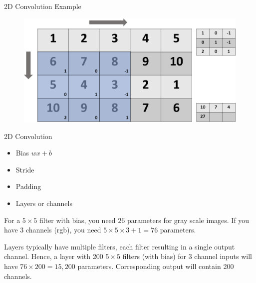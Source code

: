\begin{frame}{2D Convolution Example}
	\begin{figure}
		\includegraphics[width=.7\textwidth, center]{figures/conv-slide5-cropped}
	\end{figure}
\end{frame}

\begin{frame}{2D Convolution} 
	\begin{itemize}
		\item Bias $wx+b$ 
		\item Stride 
		\item Padding 
		\item Layers or channels 
	\end{itemize}
	For a $5\times5$ filter with bias, you need $26$ parameters for gray scale images. 
	If you have 3 channels (rgb), you need $5\times 5\times 3+1=76$ parameters. 
	
	
	Layers typically have multiple filters, each filter resulting in a single output channel. 
	Hence, a layer with 200 $5\times5$ filters (with bias) for 3 channel inputs  
	will have $76\times200=15,200$ parameters. Corresponding output will contain 200 channels. 
\end{frame}

